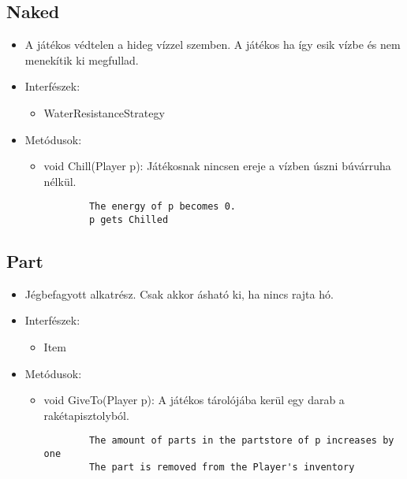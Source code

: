 \subsection{Naked}
\begin{itemize}
	\item A játékos védtelen a hideg vízzel szemben. A játékos ha így esik vízbe és nem menekítik ki megfullad.
	\item Interfészek:
	\begin{itemize}
		\item WaterResistanceStrategy
	\end{itemize}
	\item Metódusok:
	\begin{itemize}
		\item void Chill(Player p): Játékosnak nincsen ereje a vízben úszni búvárruha nélkül.
		\begin{lstlisting}
		The energy of p becomes 0.
		p gets Chilled
		\end{lstlisting}
	\end{itemize}
\end{itemize}

\subsection{Part}
\begin{itemize}
	\item Jégbefagyott alkatrész. Csak akkor ásható ki, ha nincs rajta hó.
	\item Interfészek:
	\begin{itemize}
		\item Item
	\end{itemize}
	\item Metódusok:
	\begin{itemize}
		\item void GiveTo(Player p): A játékos tárolójába kerül egy darab a rakétapisztolyból.
		\begin{lstlisting}
		The amount of parts in the partstore of p increases by one
		The part is removed from the Player's inventory
		\end{lstlisting}
	\end{itemize}
\end{itemize}


